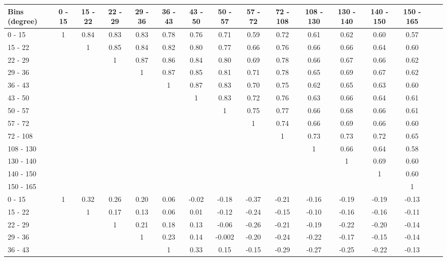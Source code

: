 \begingroup
\squeezetable
\begin{table}[h]
\begin{tabular}{l|ccccccccccccccc}
\hline\hline
Bins (degree) & 0 - 15 & 15 - 22 & 22 - 29 & 29 - 36 & 36 - 43 & 43 - 50 & 50 - 57 & 57 - 72 & 72 - 108 & 108 - 130 & 130 - 140 & 140 - 150 & 150 - 165 \\ 
\hline
0 - 15 & 1 & 0.84 & 0.83 & 0.83 & 0.78 & 0.76 & 0.71 & 0.59 & 0.72 & 0.61 & 0.62 & 0.60 & 0.57 \\ 
15 - 22 &  & 1 & 0.85 & 0.84 & 0.82 & 0.80 & 0.77 & 0.66 & 0.76 & 0.66 & 0.66 & 0.64 & 0.60 \\ 
22 - 29 &  &  & 1 & 0.87 & 0.86 & 0.84 & 0.80 & 0.69 & 0.78 & 0.66 & 0.67 & 0.66 & 0.62 \\ 
29 - 36 &  &  &  & 1 & 0.87 & 0.85 & 0.81 & 0.71 & 0.78 & 0.65 & 0.69 & 0.67 & 0.62 \\ 
36 - 43 &  &  &  &  & 1 & 0.87 & 0.83 & 0.70 & 0.75 & 0.62 & 0.65 & 0.63 & 0.60 \\ 
43 - 50 &  &  &  &  &  & 1 & 0.83 & 0.72 & 0.76 & 0.63 & 0.66 & 0.64 & 0.61 \\ 
50 - 57 &  &  &  &  &  &  & 1 & 0.75 & 0.77 & 0.66 & 0.68 & 0.66 & 0.61 \\ 
57 - 72 &  &  &  &  &  &  &  & 1 & 0.74 & 0.66 & 0.69 & 0.66 & 0.60 \\ 
72 - 108 &  &  &  &  &  &  &  &  & 1 & 0.73 & 0.73 & 0.72 & 0.65 \\ 
108 - 130 &  &  &  &  &  &  &  &  &  & 1 & 0.66 & 0.64 & 0.58 \\ 
130 - 140 &  &  &  &  &  &  &  &  &  &  & 1 & 0.69 & 0.60 \\ 
140 - 150 &  &  &  &  &  &  &  &  &  &  &  & 1 & 0.60 \\ 
150 - 165 &  &  &  &  &  &  &  &  &  &  &  &  & 1 \\ 
\hline
0 - 15 & 1 & 0.32 & 0.26 & 0.20 & 0.06 & -0.02 & -0.18 & -0.37 & -0.21 & -0.16 & -0.19 & -0.19 & -0.13 \\ 
15 - 22 &  & 1 & 0.17 & 0.13 & 0.06 & 0.01 & -0.12 & -0.24 & -0.15 & -0.10 & -0.16 & -0.16 & -0.11 \\ 
22 - 29 &  &  & 1 & 0.21 & 0.18 & 0.13 & -0.06 & -0.26 & -0.21 & -0.19 & -0.22 & -0.20 & -0.14 \\ 
29 - 36 &  &  &  & 1 & 0.23 & 0.14 & -0.002 & -0.20 & -0.24 & -0.22 & -0.17 & -0.15 & -0.14 \\ 
36 - 43 &  &  &  &  & 1 & 0.33 & 0.15 & -0.15 & -0.29 & -0.27 & -0.25 & -0.22 & -0.13 \\ 

\end{tabular}
\end{table}

